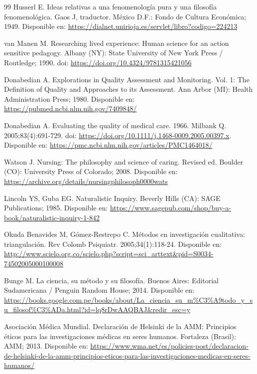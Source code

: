 \begin{thebibliography}{99}
Husserl E. Ideas relativas a una fenomenología pura y una filosofía fenomenológica. Gaos J, traductor. México D.F.: Fondo de Cultura Económica; 1949. Disponible en: \url{https://dialnet.unirioja.es/servlet/libro?codigo=224213}

van Manen M. Researching lived experience: Human science for an action sensitive pedagogy. Albany (NY): State University of New York Press / Routledge; 1990. doi: \url{https://doi.org/10.4324/9781315421056}

Donabedian A. Explorations in Quality Assessment and Monitoring. Vol. 1: The Definition of Quality and Approaches to its Assessment. Ann Arbor (MI): Health Administration Press; 1980. Disponible en: \url{https://pubmed.ncbi.nlm.nih.gov/7409848/}

Donabedian A. Evaluating the quality of medical care. 1966. Milbank Q. 2005;83(4):691-729. doi: \url{https://doi.org/10.1111/j.1468-0009.2005.00397.x}. Disponible en: \url{https://pmc.ncbi.nlm.nih.gov/articles/PMC1464018/}

Watson J. Nursing: The philosophy and science of caring. Revised ed. Boulder (CO): University Press of Colorado; 2008. Disponible en: \url{https://archive.org/details/nursingphilosoph0000wats}

Lincoln YS, Guba EG. Naturalistic Inquiry. Beverly Hills (CA): SAGE Publications; 1985. Disponible en: \url{https://www.sagepub.com/shop/buy-a-book/naturalistic-inquiry-1-842}

Okuda Benavides M, Gómez-Restrepo C. Métodos en investigación cualitativa: triangulación. Rev Colomb Psiquiatr. 2005;34(1):118-24. Disponible en: \url{http://www.scielo.org.co/scielo.php?script=sci_arttext&pid=S0034-74502005000100008}

Bunge M. La ciencia, su método y su filosofía. Buenos Aires: Editorial Sudamericana / Penguin Random House; 2014. Disponible en: \url{https://books.google.com.pe/books/about/La_ciencia_su_m%C3%A9todo_y_su_filosof%C3%ADa.html?id=lq8rDwAAQBAJ&redir_esc=y}

Asociación Médica Mundial. Declaración de Helsinki de la AMM: Principios éticos para las investigaciones médicas en seres humanos. Fortaleza (Brasil): AMM; 2013. Disponible en: \url{https://www.wma.net/es/policies-post/declaracion-de-helsinki-de-la-amm-principios-eticos-para-las-investigaciones-medicas-en-seres-humanos/}


\end{thebibliography}
